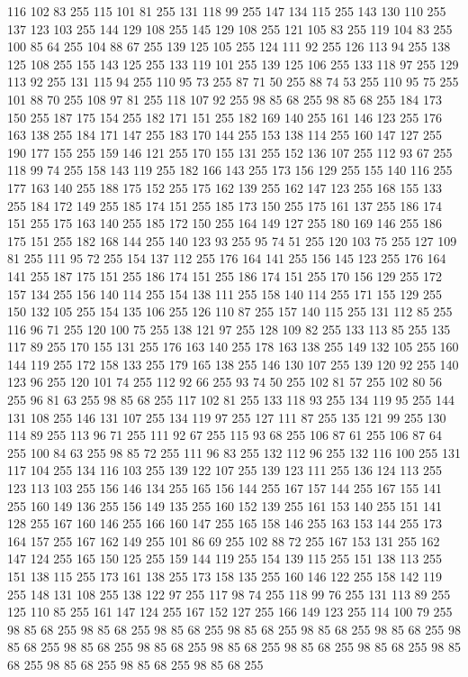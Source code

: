 116 102 83 255 115 101 81 255 131 118 99 255 147 134 115 255 143 130 110 255 137 123 103 255 144 129 108 255 145 129 108 255 121 105 83 255 119 104 83 255 100 85 64 255 104 88 67 255 139 125 105 255 124 111 92 255 126 113 94 255 138 125 108 255 155 143 125 255 133 119 101 255 139 125 106 255 133 118 97 255 129 113 92 255 131 115 94 255 110 95 73 255 87 71 50 255 88 74 53 255 110 95 75 255 101 88 70 255 108 97 81 255 118 107 92 255 98 85 68 255 98 85 68 255 184 173 150 255 187 175 154 255 182 171 151 255 182 169 140 255 161 146 123 255 176 163 138 255 184 171 147 255 183 170 144 255 153 138 114 255 160 147 127 255 190 177 155 255 159 146 121 255 170 155 131 255 152 136 107 255 112 93 67 255 118 99 74 255 158 143 119 255 182 166 143 255 173 156 129 255 155 140 116 255 177 163 140 255 188 175 152 255 175 162 139 255 162 147 123 255 168 155 133 255 184 172 149 255 185 174 151 255 185 173 150 255 175 161 137 255 186 174 151 255 175 163 140 255 185 172 150 255 164 149 127 255
180 169 146 255 186 175 151 255 182 168 144 255 140 123 93 255 95 74 51 255 120 103 75 255 127 109 81 255 111 95 72 255 154 137 112 255 176 164 141 255 156 145 123 255 176 164 141 255 187 175 151 255 186 174 151 255 186 174 151 255 170 156 129 255 172 157 134 255 156 140 114 255 154 138 111 255 158 140 114 255 171 155 129 255 150 132 105 255 154 135 106 255 126 110 87 255 157 140 115 255 131 112 85 255 116 96 71 255 120 100 75 255 138 121 97 255 128 109 82 255 133 113 85 255 135 117 89 255 170 155 131 255 176 163 140 255 178 163 138 255 149 132 105 255 160 144 119 255 172 158 133 255 179 165 138 255 146 130 107 255 139 120 92 255 140 123 96 255 120 101 74 255 112 92 66 255 93 74 50 255 102 81 57 255 102 80 56 255 96 81 63 255 98 85 68 255 117 102 81 255 133 118 93 255 134 119 95 255 144 131 108 255 146 131 107 255 134 119 97 255 127 111 87 255 135 121 99 255 130 114 89 255 113 96 71 255 111 92 67 255 115 93 68 255 106 87 61 255 106 87 64 255 100 84 63 255
98 85 72 255 111 96 83 255 132 112 96 255 132 116 100 255 131 117 104 255 134 116 103 255 139 122 107 255 139 123 111 255 136 124 113 255 123 113 103 255 156 146 134 255 165 156 144 255 167 157 144 255 167 155 141 255 160 149 136 255 156 149 135 255 160 152 139 255 161 153 140 255 151 141 128 255 167 160 146 255 166 160 147 255 165 158 146 255 163 153 144 255 173 164 157 255 167 162 149 255 101 86 69 255 102 88 72 255 167 153 131 255 162 147 124 255 165 150 125 255 159 144 119 255 154 139 115 255 151 138 113 255 151 138 115 255 173 161 138 255 173 158 135 255 160 146 122 255 158 142 119 255 148 131 108 255 138 122 97 255 117 98 74 255 118 99 76 255 131 113 89 255 125 110 85 255 161 147 124 255 167 152 127 255 166 149 123 255 114 100 79 255 98 85 68 255 98 85 68 255 98 85 68 255 98 85 68 255 98 85 68 255 98 85 68 255 98 85 68 255 98 85 68 255 98 85 68 255 98 85 68 255 98 85 68 255 98 85 68 255 98 85 68 255 98 85 68 255 98 85 68 255 98 85 68 255
